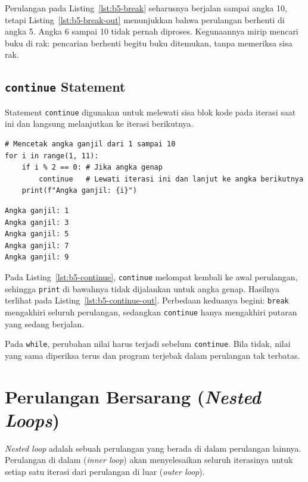Perulangan pada Listing~\ref{lst:b5-break} seharusnya berjalan sampai angka 10, tetapi Listing~\ref{lst:b5-break-out} menunjukkan bahwa perulangan berhenti di angka 5. Angka 6 sampai 10 tidak pernah diproses. Kegunaannya mirip mencari buku di rak: pencarian berhenti begitu buku ditemukan, tanpa memeriksa sisa rak.

\subsection{\texttt{continue} Statement}
Statement \texttt{continue} digunakan untuk melewati sisa blok kode pada iterasi saat ini dan langsung melanjutkan ke iterasi berikutnya.

\begin{lstlisting}[style=PythonStyle, caption={Kode Python: continue_keyword.py}, label={lst:b5-continue}]
# Mencetak angka ganjil dari 1 sampai 10
for i in range(1, 11):
    if i % 2 == 0: # Jika angka genap
        continue   # Lewati iterasi ini dan lanjut ke angka berikutnya
    print(f"Angka ganjil: {i}")
\end{lstlisting}

\begin{lstlisting}[language=bash, caption={Keluaran continue_keyword.py}, label={lst:b5-continue-out}]
Angka ganjil: 1
Angka ganjil: 3
Angka ganjil: 5
Angka ganjil: 7
Angka ganjil: 9
\end{lstlisting}

Pada Listing~\ref{lst:b5-continue}, \texttt{continue} melompat kembali ke awal perulangan, sehingga \texttt{print} di bawahnya tidak dijalankan untuk angka genap. Hasilnya terlihat pada Listing~\ref{lst:b5-continue-out}. Perbedaan keduanya begini: \texttt{break} mengakhiri seluruh perulangan, sedangkan \texttt{continue} hanya mengakhiri putaran yang sedang berjalan.

Pada \texttt{while}, perubahan nilai harus terjadi sebelum \texttt{continue}. Bila tidak, nilai yang sama diperiksa terus dan program terjebak dalam perulangan tak terbatas.

\section{Perulangan Bersarang (\textit{Nested Loops})}
\textit{Nested loop} adalah sebuah perulangan yang berada di dalam perulangan lainnya. Perulangan di dalam (\textit{inner loop}) akan menyelesaikan seluruh iterasinya untuk setiap satu iterasi dari perulangan di luar (\textit{outer loop}).

